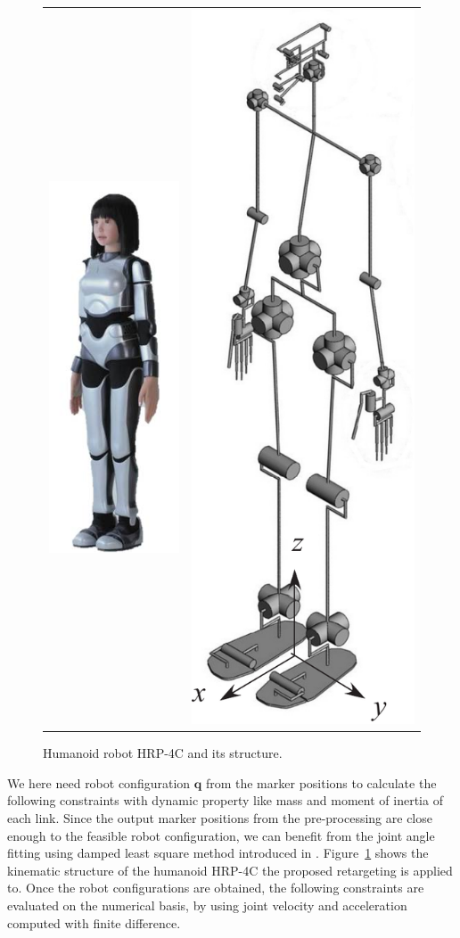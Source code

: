 \documentclass[letterpaper, 10 pt, conference]{ieeeconf}  %
\begin{document}
\begin{figure}[t]
\begin{center}
  \begin{tabular}{c@{\quad\quad}c}
  \includegraphics[height=0.8 \linewidth]{figure/HRP4C-stand}&
  \includegraphics[height=0.8 \linewidth]{figure/hrp4c-joints.pdf}
\end{tabular}
  \caption{Humanoid robot HRP-4C and its structure.} 
  \label{fig:hrp4c-joints}
\end{center}
\end{figure}

We here need robot configuration $\mathbf{q}$ from the marker
positions to calculate the following constraints with dynamic property
like mass and moment of inertia of each link.
Since the output marker positions from the pre-processing are close
enough to the feasible robot configuration, we can benefit from the
joint angle fitting using damped least square method introduced in
\cite{Nakaoka12Humanoids}. 
Figure~\ref{fig:hrp4c-joints} shows the kinematic structure of the
humanoid HRP-4C \cite{Kaneko09Humanoids} the proposed retargeting is
applied to. 
Once the robot configurations are obtained, the following 
constraints are evaluated on the numerical basis, by using
joint velocity and acceleration computed with finite difference.
 
\end{document}
